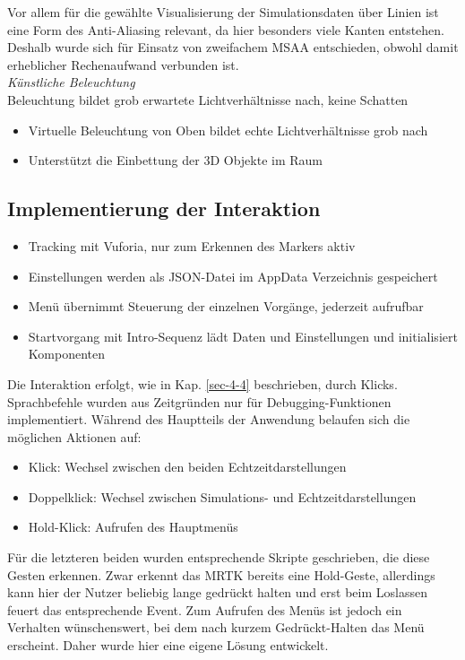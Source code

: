 Vor allem für die gewählte Visualisierung der Simulationsdaten über Linien ist eine Form des Anti-Aliasing relevant, da hier besonders viele Kanten entstehen. Deshalb wurde sich für Einsatz von zweifachem MSAA entschieden, obwohl damit erheblicher Rechenaufwand verbunden ist.\\

\textit{Künstliche Beleuchtung}\\
Beleuchtung bildet grob erwartete Lichtverhältnisse nach, keine Schatten
\begin{itemize}
	\item Virtuelle Beleuchtung von Oben bildet echte Lichtverhältnisse grob nach
	\item Unterstützt die Einbettung der 3D Objekte im Raum
\end{itemize}


\subsection{Implementierung der Interaktion}
\begin{itemize}[rightmargin=12px, topsep=-12px]
	\setlength{\itemsep}{-1pt}
	\singlespacing
	\item Tracking mit Vuforia, nur zum Erkennen des Markers aktiv
	\item Einstellungen werden als JSON-Datei im AppData Verzeichnis gespeichert
	\item Menü übernimmt Steuerung der einzelnen Vorgänge, jederzeit aufrufbar
	\item Startvorgang mit Intro-Sequenz lädt Daten und Einstellungen und initialisiert Komponenten
\end{itemize}
Die Interaktion erfolgt, wie in Kap. \ref{sec-4-4} beschrieben, durch Klicks. Sprachbefehle wurden aus Zeitgründen nur für Debugging-Funktionen implementiert. 
Während des Hauptteils der Anwendung belaufen sich die möglichen Aktionen auf:

\begin{itemize}
	\setlength{\itemsep}{-1pt}
	\singlespacing
	\item Klick: Wechsel zwischen den beiden Echtzeitdarstellungen
	\item Doppelklick: Wechsel zwischen Simulations- und Echtzeitdarstellungen
	\item Hold-Klick: Aufrufen des Hauptmenüs
\end{itemize}

Für die letzteren beiden wurden entsprechende Skripte geschrieben, die diese Gesten erkennen. Zwar erkennt das MRTK bereits eine Hold-Geste, allerdings kann hier der Nutzer beliebig lange gedrückt halten und erst beim Loslassen feuert das entsprechende Event. Zum Aufrufen des Menüs ist jedoch ein Verhalten wünschenswert, bei dem nach kurzem Gedrückt-Halten das Menü erscheint. Daher wurde hier eine eigene Lösung entwickelt.\\

